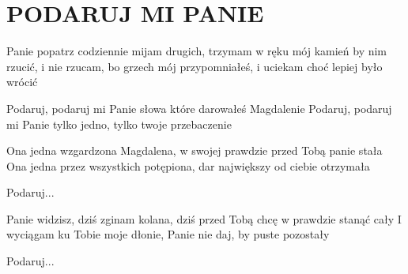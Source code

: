 \documentclass[../../../songbook.tex]{subfiles}
\begin{document}
\TabPositions{8cm} %
\section*{PODARUJ MI PANIE}
{}
\vspace{0.5cm}
Panie popatrz codziennie mijam drugich,		 \newline
trzymam w ręku mój kamień by nim rzucić,	 \newline
i nie rzucam, bo grzech mój przypomniałeś,	 \newline
i uciekam choć lepiej było wrócić			 \newline

\-\hspace{1cm} Podaruj, podaruj mi Panie					 \newline
\-\hspace{1cm} słowa które darowałeś Magdalenie				 \newline
\-\hspace{1cm} Podaruj, podaruj mi Panie					 \newline
\-\hspace{1cm} tylko jedno, tylko twoje przebaczenie		 \newline

Ona jedna wzgardzona Magdalena, \newline
w swojej prawdzie przed Tobą panie stała \newline
Ona jedna przez wszystkich potępiona, \newline
dar największy od ciebie otrzymała \newline

\-\hspace{1cm} Podaruj... \newline

Panie widzisz, dziś zginam kolana, \newline
dziś przed Tobą chcę w prawdzie stanąć cały \newline
I wyciągam ku Tobie moje dłonie, \newline
Panie nie daj, by puste pozostały \newline

\-\hspace{1cm} Podaruj... \newline
\end{document}
